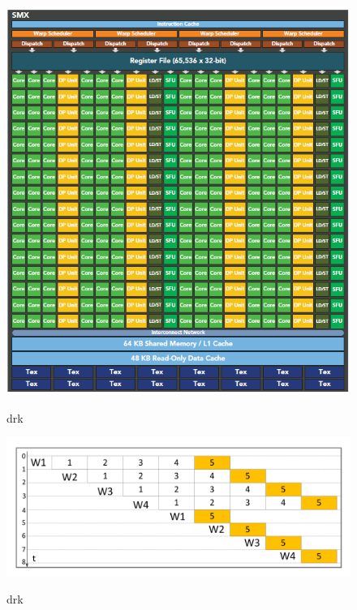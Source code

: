 \begin{figure}
\setlength{\belowcaptionskip}{-0.5cm}
  \begin{center}
    {\includegraphics[width=1 \textwidth]{figures/smx.png}}
    \end{center}
  \caption{{\footnotesize{drk}}}
  \label{drk}
\end{figure}
\begin{figure}
\setlength{\belowcaptionskip}{-0.5cm}
  \begin{center}
    {\includegraphics[width=1 \textwidth]{figures/warpsketch.pdf}}
    \end{center}
  \caption{{\footnotesize{drk}}}
  \label{drk}
\end{figure}
